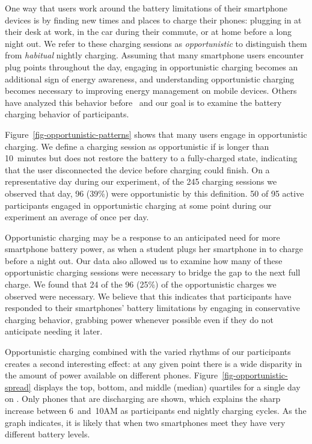 One way that users work around the battery limitations of their smartphone
devices is by finding new times and places to charge their phones: plugging
in at their desk at work, in the car during their commute, or at home before
a long night out. We refer to these charging sessions as
\textit{opportunistic} to distinguish them from \textit{habitual} nightly
charging. Assuming that many smartphone users encounter plug points
throughout the day, engaging in opportunistic charging becomes an additional
sign of energy awareness, and understanding opportunistic charging becomes
necessary to improving energy management on mobile devices. Others have analyzed
this behavior before~\cite{banerjee:ubicomp:2007} and
our goal is to examine the battery charging behavior of \PhoneLab{} participants.

Figure~\ref{fig-opportunistic-patterns} shows that many users engage in
opportunistic charging. We define a charging session as opportunistic if is
longer than 10~minutes but does not restore the battery to a fully-charged
state, indicating that the user disconnected the device before charging could
finish. On a representative day during our experiment, of the 245 charging
sessions we observed that day, 96 (39\%) were opportunistic by this
definition. 50 of 95 active participants engaged in opportunistic charging at
some point during our experiment an average of once per day.

Opportunistic charging may be a response to an anticipated need for more
smartphone battery power, as when a student plugs her smartphone in to charge
before a night out. Our data also allowed us to examine how many of these
opportunistic charging sessions were necessary to bridge the gap to the next
full charge. We found that 24 of the 96 (25\%) of the opportunistic charges
we observed were necessary. We believe that this indicates that participants
have responded to their smartphones' battery limitations by engaging in
conservative charging behavior, grabbing power whenever possible even if they
do not anticipate needing it later.

Opportunistic charging combined with the varied rhythms of our participants
creates a second interesting effect: at any given point there is a wide
disparity in the amount of power available on different phones.
Figure~\ref{fig-opportunistic-spread} displays the top, bottom, and middle
(median) quartiles for a single day on \PhoneLab{}. Only phones that are
discharging are shown, which explains the sharp increase between 6~and~10AM
as participants end nightly charging cycles.  As the graph indicates, it is
likely that when two smartphones meet they have very different battery
levels.

